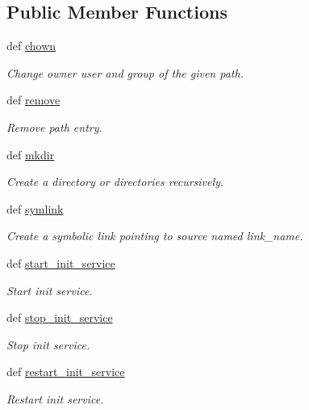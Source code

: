 \subsection*{Public Member Functions}
\begin{DoxyCompactItemize}
\item 
def \hyperlink{classadmin_1_1shell_a539012368a068a40cd347acbe49989d5}{chown}
\begin{DoxyCompactList}\small\item\em Change owner user and group of the given path. \end{DoxyCompactList}\item 
def \hyperlink{classadmin_1_1shell_ad4f8d9280283a993eec0bc5dcade6d99}{remove}
\begin{DoxyCompactList}\small\item\em Remove path entry. \end{DoxyCompactList}\item 
def \hyperlink{classadmin_1_1shell_adcdf00aa6acc1cf519ece418ce14a7f1}{mkdir}
\begin{DoxyCompactList}\small\item\em Create a directory or directories recursively. \end{DoxyCompactList}\item 
def \hyperlink{classadmin_1_1shell_a9cc97c2976b95fbcfa88b314803aa2bf}{symlink}
\begin{DoxyCompactList}\small\item\em Create a symbolic link pointing to source named {\ttfamily link\-\_\-name}. \end{DoxyCompactList}\item 
def \hyperlink{classadmin_1_1shell_a432e79bf26b0adb3e7fcf2f13f96229e}{start\-\_\-init\-\_\-service}
\begin{DoxyCompactList}\small\item\em Start init service. \end{DoxyCompactList}\item 
def \hyperlink{classadmin_1_1shell_a20ba085e92f2f4a9332d8d9c95ce7aa1}{stop\-\_\-init\-\_\-service}
\begin{DoxyCompactList}\small\item\em Stop init service. \end{DoxyCompactList}\item 
def \hyperlink{classadmin_1_1shell_ab6f38a2fae6ea2cc870c1de2d6cb6017}{restart\-\_\-init\-\_\-service}
\begin{DoxyCompactList}\small\item\em Restart init service. \end{DoxyCompactList}\end{DoxyCompactItemize}
